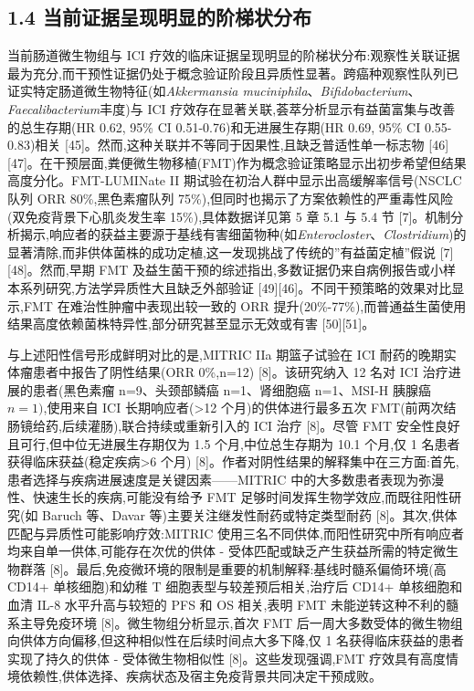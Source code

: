 \documentclass[11pt]{article}
\begin{document}
\subsection{1.4 当前证据呈现明显的阶梯状分布}\label{ux5f53ux524dux8bc1ux636eux5448ux73b0ux660eux663eux7684ux9636ux68afux72b6ux5206ux5e03}

当前肠道微生物组与 ICI 疗效的临床证据呈现明显的阶梯状分布:观察性关联证据最为充分,而干预性证据仍处于概念验证阶段且异质性显著。跨癌种观察性队列已证实特定肠道微生物特征(如\emph{Akkermansia muciniphila}、\emph{Bifidobacterium}、\emph{Faecalibacterium}丰度)与 ICI 疗效存在显著关联,荟萃分析显示有益菌富集与改善的总生存期(HR 0.62, 95\% CI 0.51-0.76)和无进展生存期(HR 0.69, 95\% CI 0.55-0.83)相关 {[}45{]}。然而,这种关联并不等同于因果性,且缺乏普适性单一标志物 {[}46{]}{[}47{]}。在干预层面,粪便微生物移植(FMT)作为概念验证策略显示出初步希望但结果高度分化。FMT-LUMINate II 期试验在初治人群中显示出高缓解率信号(NSCLC 队列 ORR 80\%,黑色素瘤队列 75\%),但同时也揭示了方案依赖性的严重毒性风险(双免疫背景下心肌炎发生率 15\%),具体数据详见第 5 章 5.1 与 5.4 节 {[}7{]}。机制分析揭示,响应者的获益主要源于基线有害细菌物种(如\emph{Enterocloster}、\emph{Clostridium})的显著清除,而非供体菌株的成功定植,这一发现挑战了传统的''有益菌定植''假说 {[}7{]}{[}48{]}。然而,早期 FMT 及益生菌干预的综述指出,多数证据仍来自病例报告或小样本系列研究,方法学异质性大且缺乏外部验证 {[}49{]}{[}46{]}。不同干预策略的效果对比显示,FMT 在难治性肿瘤中表现出较一致的 ORR 提升(20\%-77\%),而普通益生菌使用结果高度依赖菌株特异性,部分研究甚至显示无效或有害 {[}50{]}{[}51{]}。

与上述阳性信号形成鲜明对比的是,MITRIC IIa 期篮子试验在 ICI 耐药的晚期实体瘤患者中报告了阴性结果(ORR 0\%,n=12) {[}8{]}。该研究纳入 12 名对 ICI 治疗进展的患者(黑色素瘤 n=9、头颈部鳞癌 n=1、肾细胞癌 n=1、MSI-H 胰腺癌 \(n=1)\),使用来自 ICI 长期响应者(\textgreater12 个月)的供体进行最多五次 FMT(前两次结肠镜给药,后续灌肠),联合持续或重新引入的 ICI 治疗 {[}8{]}。尽管 FMT 安全性良好且可行,但中位无进展生存期仅为 1.5 个月,中位总生存期为 10.1 个月,仅 1 名患者获得临床获益(稳定疾病\textgreater6 个月) {[}8{]}。作者对阴性结果的解释集中在三方面:首先,患者选择与疾病进展速度是关键因素------MITRIC 中的大多数患者表现为弥漫性、快速生长的疾病,可能没有给予 FMT 足够时间发挥生物学效应,而既往阳性研究(如 Baruch 等、Davar 等)主要关注继发性耐药或特定类型耐药 {[}8{]}。其次,供体匹配与异质性可能影响疗效:MITRIC 使用三名不同供体,而阳性研究中所有响应者均来自单一供体,可能存在次优的供体 - 受体匹配或缺乏产生获益所需的特定微生物群落 {[}8{]}。最后,免疫微环境的限制是重要的机制解释:基线时髓系偏倚环境(高 CD14+ 单核细胞)和幼稚 T 细胞表型与较差预后相关,治疗后 CD14+ 单核细胞和血清 IL-8 水平升高与较短的 PFS 和 OS 相关,表明 FMT 未能逆转这种不利的髓系主导免疫环境 {[}8{]}。微生物组分析显示,首次 FMT 后一周大多数受体的微生物组向供体方向偏移,但这种相似性在后续时间点大多下降,仅 1 名获得临床获益的患者实现了持久的供体 - 受体微生物相似性 {[}8{]}。这些发现强调,FMT 疗效具有高度情境依赖性,供体选择、疾病状态及宿主免疫背景共同决定干预成败。
\end{document}
